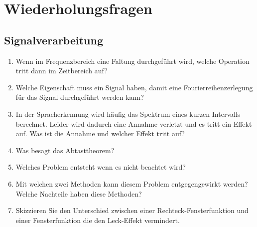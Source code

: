 
\chapter{Wiederholungsfragen}
\section{Signalverarbeitung}
\begin{enumerate}
	\item Wenn im Frequenzbereich eine Faltung durchgeführt wird, welche Operation tritt dann im Zeitbereich auf?
	\item Welche Eigenschaft muss ein Signal haben, damit eine Fourierreihenzerlegung für das Signal durchgeführt werden kann?

	\item In der Spracherkennung wird häufig das Spektrum eines kurzen Intervalls berechnet. Leider wird dadurch eine Annahme verletzt und es tritt ein Effekt auf. Was ist die Annahme und welcher Effekt tritt auf?
	\item Was besagt das Abtasttheorem?
	\item Welches Problem entsteht wenn es nicht beachtet wird?
	\item Mit welchen zwei Methoden kann diesem Problem entgegengewirkt werden? Welche Nachteile haben diese Methoden?
	\item Skizzieren Sie den Unterschied zwischen einer Rechteck-Fensterfunktion und einer Fensterfunktion die den Leck-Effekt vermindert.
\end{enumerate}



